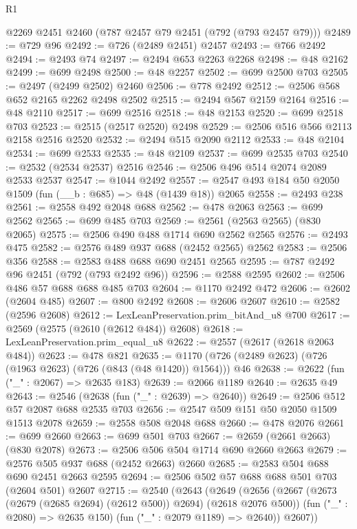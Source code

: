 \begin{lexlean}{R1}
\begin{coremodule}
    @2269
    @2451
    @2460
    (@787 @2457 @79 @2451 (@792 (@793 @2457 @79)))
@2489 := @729 @96
@2492 := @726 (@2489 @2451) @2457
@2493 := @766 @2492
@2494 := @2493 @74
@2497 := @2494 @653 @2263 @2268
@2498 := @48 @2162
@2499 := @699 @2498
@2500 := @48 @2257
@2502 := @699 @2500 @703
@2505 := @2497 (@2499 @2502) @2460
@2506 := @778 @2492
@2512 := @2506 @568 @652 @2165 @2262 @2498 @2502
@2515 := @2494 @567 @2159 @2164
@2516 := @48 @2110
@2517 := @699 @2516
@2518 := @48 @2153
@2520 := @699 @2518 @703
@2523 := @2515 (@2517 @2520) @2498
@2529 := @2506 @516 @566 @2113 @2158 @2516 @2520
@2532 := @2494 @515 @2090 @2112
@2533 := @48 @2104
@2534 := @699 @2533
@2535 := @48 @2109
@2537 := @699 @2535 @703
@2540 := @2532 (@2534 @2537) @2516
@2546 := @2506 @496 @514 @2074 @2089 @2533 @2537
@2547 := @1044 @2492
@2557 := @2547 @493 @184 @50 @2050 @1509 (fun (__b : @685) => @48 (@1439 @18)) @2065
@2558 := @2493 @238
@2561 := @2558 @492 @2048 @688
@2562 := @478 @2063
@2563 := @699 @2562
@2565 := @699 @485 @703
@2569 := @2561 (@2563 @2565) (@830 @2065)
@2575 := @2506 @490 @488 @1714 @690 @2562 @2565
@2576 := @2493 @475
@2582 := @2576 @489 @937 @688 (@2452 @2565) @2562
@2583 := @2506 @356
@2588 := @2583 @488 @688 @690 @2451 @2565
@2595 := @787 @2492 @96 @2451 (@792 (@793 @2492 @96))
@2596 := @2588 @2595
@2602 := @2506 @486 @57 @688 @688 @485 @703
@2604 := @1170 @2492 @472
@2606 := @2602 (@2604 @485)
@2607 := @800 @2492
@2608 := @2606 @2607
@2610 := @2582 (@2596 @2608)
@2612 := LexLeanPreservation.prim_bitAnd_u8 @700
@2617 := @2569 (@2575 (@2610 (@2612 @484)) @2608)
@2618 := LexLeanPreservation.prim_equal_u8
@2622 := @2557 (@2617 (@2618 @2063 @484))
@2623 := @478 @821
@2635 := @1170 (@726 (@2489 @2623) (@726 (@1963 @2623) (@726 (@843 (@48 @1420)) @1564))) @46
@2638 := @2622 (fun ("_" : @2067) => @2635 @183)
@2639 := @2066 @1189
@2640 := @2635 @49
@2643 := @2546 (@2638 (fun ("_" : @2639) => @2640))
@2649 := @2506 @512 @57 @2087 @688 @2535 @703
@2656 := @2547 @509 @151 @50 @2050 @1509 @1513 @2078
@2659 := @2558 @508 @2048 @688
@2660 := @478 @2076
@2661 := @699 @2660
@2663 := @699 @501 @703
@2667 := @2659 (@2661 @2663) (@830 @2078)
@2673 := @2506 @506 @504 @1714 @690 @2660 @2663
@2679 := @2576 @505 @937 @688 (@2452 @2663) @2660
@2685 := @2583 @504 @688 @690 @2451 @2663 @2595
@2694 := @2506 @502 @57 @688 @688 @501 @703 (@2604 @501) @2607
@2715 := @2540
    (@2643
      (@2649
        (@2656
          (@2667 (@2673 (@2679 (@2685 @2694) (@2612 @500)) @2694) (@2618 @2076 @500))
          (fun ("_" : @2080) => @2635 @150)
          (fun ("_" : @2079 @1189) => @2640))
        @2607))

\end{coremodule}
\end{lexlean}
